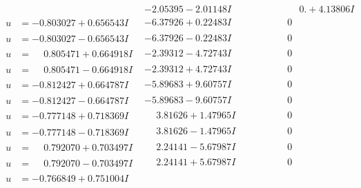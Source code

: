 \documentclass[1p]{elsarticle_modified}
\theoremstyle{definition}
\begin{document}
$$\begin{array}{c|c|c}
 & -2.05395 - 2.01148 I & \phantom{-0.000000 -}0. + 4.13806 I \\ \hline\begin{aligned}
u &= -0.803027 + 0.656543 I\end{aligned}
 & -6.37926 + 0.22483 I & \phantom{-0.000000 } 0 \\ \hline\begin{aligned}
u &= -0.803027 - 0.656543 I\end{aligned}
 & -6.37926 - 0.22483 I & \phantom{-0.000000 } 0 \\ \hline\begin{aligned}
u &= \phantom{-}0.805471 + 0.664918 I\end{aligned}
 & -2.39312 - 4.72743 I & \phantom{-0.000000 } 0 \\ \hline\begin{aligned}
u &= \phantom{-}0.805471 - 0.664918 I\end{aligned}
 & -2.39312 + 4.72743 I & \phantom{-0.000000 } 0 \\ \hline\begin{aligned}
u &= -0.812427 + 0.664787 I\end{aligned}
 & -5.89683 + 9.60757 I & \phantom{-0.000000 } 0 \\ \hline\begin{aligned}
u &= -0.812427 - 0.664787 I\end{aligned}
 & -5.89683 - 9.60757 I & \phantom{-0.000000 } 0 \\ \hline\begin{aligned}
u &= -0.777148 + 0.718369 I\end{aligned}
 & \phantom{-}3.81626 + 1.47965 I & \phantom{-0.000000 } 0 \\ \hline\begin{aligned}
u &= -0.777148 - 0.718369 I\end{aligned}
 & \phantom{-}3.81626 - 1.47965 I & \phantom{-0.000000 } 0 \\ \hline\begin{aligned}
u &= \phantom{-}0.792070 + 0.703497 I\end{aligned}
 & \phantom{-}2.24141 - 5.67987 I & \phantom{-0.000000 } 0 \\ \hline\begin{aligned}
u &= \phantom{-}0.792070 - 0.703497 I\end{aligned}
 & \phantom{-}2.24141 + 5.67987 I & \phantom{-0.000000 } 0 \\ \hline\begin{aligned}
u &= -0.766849 + 0.751004 I\end{aligned}

\end{array}$$
\end{document}
